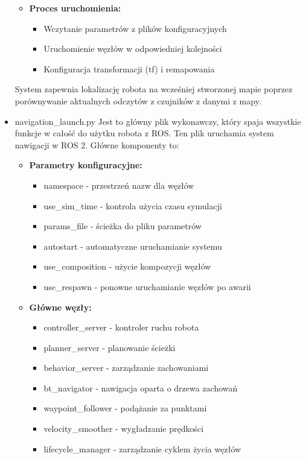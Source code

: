 \documentclass[a4paper,twoside,12pt]{book}
\begin{document}
\begin{itemize}
\begin{itemize}
	\item \textbf{Proces uruchomienia:}
		\begin{itemize}
		\item Wczytanie parametrów z plików konfiguracyjnych
		\item Uruchomienie węzłów w odpowiedniej kolejności
		\item Konfiguracja transformacji (tf) i remapowania
		\end{itemize}
	\end{itemize}

	System zapewnia lokalizację robota na wcześniej stworzonej mapie poprzez porównywanie aktualnych odczytów z czujników z danymi z mapy.
	\newpage
	\item navigation\_launch.py
	Jest to główny plik wykonawczy, który spaja wszystkie funkcje w całość do użytku robota z ROS.
	Ten plik uruchamia system nawigacji w ROS 2. Główne komponenty to:

	\begin{itemize}
	\item \textbf{Parametry konfiguracyjne:}
		\begin{itemize}
		\item namespace - przestrzeń nazw dla węzłów
		\item use\_sim\_time - kontrola użycia czasu symulacji
		\item params\_file - ścieżka do pliku parametrów
		\item autostart - automatyczne uruchamianie systemu
		\item use\_composition - użycie kompozycji węzłów
		\item use\_respawn - ponowne uruchamianie węzłów po awarii
		\end{itemize}

	\item \textbf{Główne węzły:}
		\begin{itemize}
		\item controller\_server - kontroler ruchu robota
		\item planner\_server - planowanie ścieżki
		\item behavior\_server - zarządzanie zachowaniami
		\item bt\_navigator - nawigacja oparta o drzewa zachowań
		\item waypoint\_follower - podążanie za punktami
		\item velocity\_smoother - wygładzanie prędkości
		\item lifecycle\_manager - zarządzanie cyklem życia węzłów
		\end{itemize}


\end{itemize}
\end{itemize}
\end{document}
